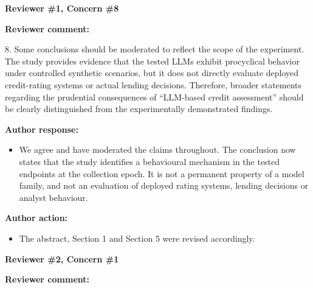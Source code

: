 \documentclass[11pt]{article}
\newcommand{\rvcomment}[1]{{\color{ReviewerGreen}#1}}
\newcommand{\concern}[1]{\textbf{\color{ReviewerGreen}#1}}
\begin{document}
\vspace{12pt}
\concern{Reviewer \#1, Concern \#8}

\concern{Reviewer comment:}

\rvcomment{8. Some conclusions should be moderated to reflect the scope of the experiment. The study provides evidence that the tested LLMs exhibit procyclical behavior under controlled synthetic scenarios, but it does not directly evaluate deployed credit-rating systems or actual lending decisions. Therefore, broader statements regarding the prudential consequences of ``LLM-based credit assessment'' should be clearly distinguished from the experimentally demonstrated findings.}

\textbf{Author response:}

\begin{itemize}

\item We agree and have moderated the claims throughout. The conclusion now states that the study identifies a behavioural mechanism in the tested endpoints at the collection epoch. It is not a permanent property of a model family, and not an evaluation of deployed rating systems, lending decisions or analyst behaviour.

\end{itemize}

\textbf{Author action:}

\begin{itemize}

\item The abstract, Section 1 and Section 5 were revised accordingly.

\end{itemize}

\vspace{12pt}
\concern{Reviewer \#2, Concern \#1}

\concern{Reviewer comment:}
\end{document}
